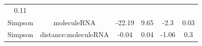 \documentclass[]{article}
\begin{document}
\begin{longtable}[]{@{}cccccc@{}}
\begin{minipage}[t]{0.09\columnwidth}
0.11\strut
\end{minipage}\tabularnewline
\begin{minipage}[t]{0.12\columnwidth}\centering\strut
Simpson\strut
\end{minipage} & \begin{minipage}[t]{0.24\columnwidth}\centering\strut
moleculeRNA\strut
\end{minipage} & \begin{minipage}[t]{0.11\columnwidth}\centering\strut
-22.19\strut
\end{minipage} & \begin{minipage}[t]{0.14\columnwidth}\centering\strut
9.65\strut
\end{minipage} & \begin{minipage}[t]{0.12\columnwidth}\centering\strut
-2.3\strut
\end{minipage} & \begin{minipage}[t]{0.09\columnwidth}\centering\strut
0.03\strut
\end{minipage}\tabularnewline
\begin{minipage}[t]{0.12\columnwidth}\centering\strut
Simpson\strut
\end{minipage} & \begin{minipage}[t]{0.24\columnwidth}\centering\strut
distance:moleculeRNA\strut
\end{minipage} & \begin{minipage}[t]{0.11\columnwidth}\centering\strut
-0.04\strut
\end{minipage} & \begin{minipage}[t]{0.14\columnwidth}\centering\strut
0.04\strut
\end{minipage} & \begin{minipage}[t]{0.12\columnwidth}\centering\strut
-1.06\strut
\end{minipage} & \begin{minipage}[t]{0.09\columnwidth}\centering\strut
0.3\strut
\end{minipage}\tabularnewline
\bottomrule
\end{longtable}
\end{document}
